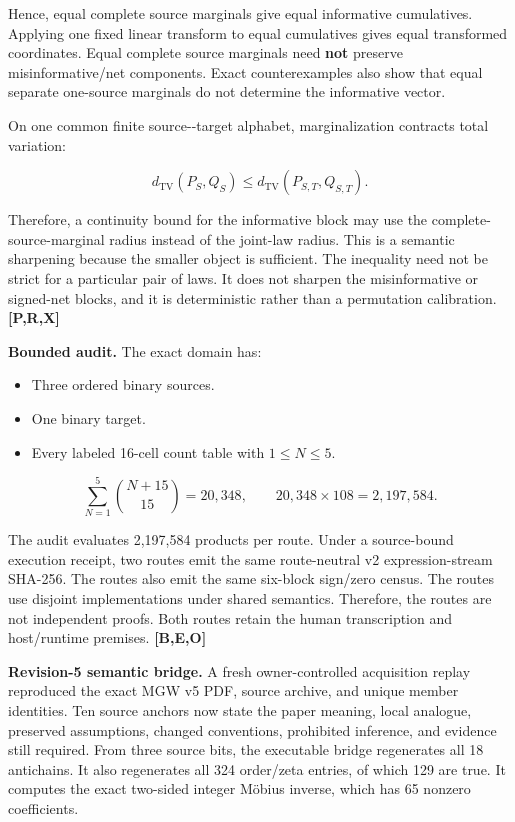\documentclass[
  11pt,
  a4paper,
]{article}
\providecommand{\tightlist}{%
  \setlength{\itemsep}{0pt}\setlength{\parskip}{0pt}}
\let\pidoldtexttt\texttt
\renewcommand{\texttt}[1]{\pidoldtexttt{\seqsplit{#1}}}%
\begin{document}
Hence, equal complete source marginals give equal informative
cumulatives. Applying one fixed linear transform to equal cumulatives
gives equal transformed coordinates. Equal complete source marginals
need \textbf{not} preserve misinformative/net components. Exact
counterexamples also show that equal separate one-source marginals do
not determine the informative vector.

On one common finite source-\/-target alphabet, marginalization
contracts total variation:

\[
d_{\mathrm{TV}}(P_S,Q_S)\le d_{\mathrm{TV}}(P_{S,T},Q_{S,T}).
\]

Therefore, a continuity bound for the informative block may use the
complete-source-marginal radius instead of the joint-law radius. This is
a semantic sharpening because the smaller object is sufficient. The
inequality need not be strict for a particular pair of laws. It does not
sharpen the misinformative or signed-net blocks, and it is deterministic
rather than a permutation calibration. \textbf{{[}P,R,X{]}}

\textbf{Bounded audit.} The exact domain has:

\begin{itemize}
\tightlist
\item
  Three ordered binary sources.
\item
  One binary target.
\item
  Every labeled 16-cell count table with \(1\le N\le5\).
\end{itemize}

\[
\sum_{N=1}^{5}\binom{N+15}{15}=20{,}348,
\qquad
20{,}348\times108=2{,}197{,}584.
\]


The audit evaluates 2,197,584 products per route. Under a source-bound
execution receipt, two routes emit the same route-neutral v2
expression-stream SHA-256. The routes also emit the same six-block
sign/zero census. The routes use disjoint implementations under shared
semantics. Therefore, the routes are not independent proofs. Both routes
retain the human transcription and host/runtime premises.
\textbf{{[}B,E,O{]}}

\textbf{Revision-5 semantic bridge.} A fresh owner-controlled
acquisition replay reproduced the exact MGW v5 PDF, source archive, and
unique \texttt{apstemplate.tex} member identities. Ten source anchors
now state the paper meaning, local analogue, preserved assumptions,
changed conventions, prohibited inference, and evidence still required.
From three source bits, the executable bridge regenerates all 18
antichains. It also regenerates all 324 order/zeta entries, of which 129
are true. It computes the exact two-sided integer Möbius inverse, which
has 65 nonzero coefficients.
\end{document}
